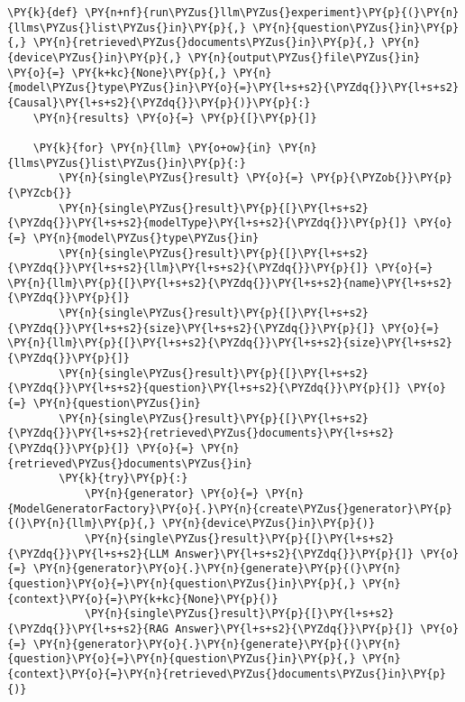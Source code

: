 \documentclass[11pt]{wseas}
\begin{document}
    \begin{tcolorbox}[breakable, size=fbox, boxrule=1pt, pad at break*=1mm,colback=cellbackground, colframe=cellborder]
\begin{Verbatim}[commandchars=\\\{\}]
\PY{k}{def} \PY{n+nf}{run\PYZus{}llm\PYZus{}experiment}\PY{p}{(}\PY{n}{llms\PYZus{}list\PYZus{}in}\PY{p}{,} \PY{n}{question\PYZus{}in}\PY{p}{,} \PY{n}{retrieved\PYZus{}documents\PYZus{}in}\PY{p}{,} \PY{n}{device\PYZus{}in}\PY{p}{,} \PY{n}{output\PYZus{}file\PYZus{}in} \PY{o}{=} \PY{k+kc}{None}\PY{p}{,} \PY{n}{model\PYZus{}type\PYZus{}in}\PY{o}{=}\PY{l+s+s2}{\PYZdq{}}\PY{l+s+s2}{Causal}\PY{l+s+s2}{\PYZdq{}}\PY{p}{)}\PY{p}{:}
    \PY{n}{results} \PY{o}{=} \PY{p}{[}\PY{p}{]}

    \PY{k}{for} \PY{n}{llm} \PY{o+ow}{in} \PY{n}{llms\PYZus{}list\PYZus{}in}\PY{p}{:}
        \PY{n}{single\PYZus{}result} \PY{o}{=} \PY{p}{\PYZob{}}\PY{p}{\PYZcb{}}
        \PY{n}{single\PYZus{}result}\PY{p}{[}\PY{l+s+s2}{\PYZdq{}}\PY{l+s+s2}{modelType}\PY{l+s+s2}{\PYZdq{}}\PY{p}{]} \PY{o}{=} \PY{n}{model\PYZus{}type\PYZus{}in}
        \PY{n}{single\PYZus{}result}\PY{p}{[}\PY{l+s+s2}{\PYZdq{}}\PY{l+s+s2}{llm}\PY{l+s+s2}{\PYZdq{}}\PY{p}{]} \PY{o}{=} \PY{n}{llm}\PY{p}{[}\PY{l+s+s2}{\PYZdq{}}\PY{l+s+s2}{name}\PY{l+s+s2}{\PYZdq{}}\PY{p}{]}
        \PY{n}{single\PYZus{}result}\PY{p}{[}\PY{l+s+s2}{\PYZdq{}}\PY{l+s+s2}{size}\PY{l+s+s2}{\PYZdq{}}\PY{p}{]} \PY{o}{=} \PY{n}{llm}\PY{p}{[}\PY{l+s+s2}{\PYZdq{}}\PY{l+s+s2}{size}\PY{l+s+s2}{\PYZdq{}}\PY{p}{]}
        \PY{n}{single\PYZus{}result}\PY{p}{[}\PY{l+s+s2}{\PYZdq{}}\PY{l+s+s2}{question}\PY{l+s+s2}{\PYZdq{}}\PY{p}{]} \PY{o}{=} \PY{n}{question\PYZus{}in}
        \PY{n}{single\PYZus{}result}\PY{p}{[}\PY{l+s+s2}{\PYZdq{}}\PY{l+s+s2}{retrieved\PYZus{}documents}\PY{l+s+s2}{\PYZdq{}}\PY{p}{]} \PY{o}{=} \PY{n}{retrieved\PYZus{}documents\PYZus{}in}   
        \PY{k}{try}\PY{p}{:}
            \PY{n}{generator} \PY{o}{=} \PY{n}{ModelGeneratorFactory}\PY{o}{.}\PY{n}{create\PYZus{}generator}\PY{p}{(}\PY{n}{llm}\PY{p}{,} \PY{n}{device\PYZus{}in}\PY{p}{)}
            \PY{n}{single\PYZus{}result}\PY{p}{[}\PY{l+s+s2}{\PYZdq{}}\PY{l+s+s2}{LLM Answer}\PY{l+s+s2}{\PYZdq{}}\PY{p}{]} \PY{o}{=} \PY{n}{generator}\PY{o}{.}\PY{n}{generate}\PY{p}{(}\PY{n}{question}\PY{o}{=}\PY{n}{question\PYZus{}in}\PY{p}{,} \PY{n}{context}\PY{o}{=}\PY{k+kc}{None}\PY{p}{)}
            \PY{n}{single\PYZus{}result}\PY{p}{[}\PY{l+s+s2}{\PYZdq{}}\PY{l+s+s2}{RAG Answer}\PY{l+s+s2}{\PYZdq{}}\PY{p}{]} \PY{o}{=} \PY{n}{generator}\PY{o}{.}\PY{n}{generate}\PY{p}{(}\PY{n}{question}\PY{o}{=}\PY{n}{question\PYZus{}in}\PY{p}{,} \PY{n}{context}\PY{o}{=}\PY{n}{retrieved\PYZus{}documents\PYZus{}in}\PY{p}{)}

\end{Verbatim}
\end{tcolorbox}
\end{document}
